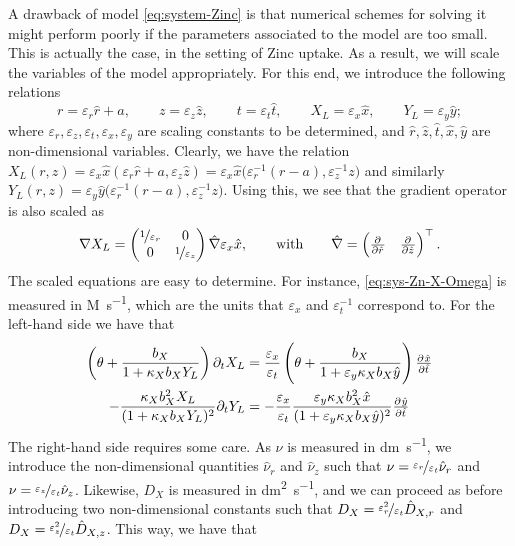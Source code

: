 \documentclass[11pt]{article}
\begin{document}
A drawback of model \eqref{eq:system-Zinc} is that numerical schemes for solving it might perform poorly if the parameters associated to the model are too small. This is actually the case, in the setting of Zinc uptake. As a result, we will scale the variables of the model appropriately. For this end, we introduce the following relations
\[
    r = \varepsilon_r \hat{r} + a,
    \qquad
    z = \varepsilon_z \hat{z},
    \qquad
    t = \varepsilon_t \hat{t},
    \qquad
    X_L = \varepsilon_x \hat{x},
    \qquad
    Y_L = \varepsilon_y \hat{y};
\]
where \( \varepsilon_r, \varepsilon_z, \varepsilon_t, \varepsilon_x, \varepsilon_y\) are scaling constants to be determined, and \(\hat{r}, \hat z, \hat t, \hat x, \hat y\) are non-dimensional variables.
Clearly, we have the relation \(X_L(r,z) = \varepsilon_x \hat{x} (\varepsilon_r \hat r + a, \varepsilon_z \hat z) = \varepsilon_x \hat{x} \big( \varepsilon_r^{-1} (r-a) , \varepsilon_z^{-1} z\big) \) and similarly \(Y_L (r,z) = \varepsilon_y \hat{y} \big( \varepsilon_r^{-1} (r-a), \varepsilon_z^{-1} z \big)\). Using this, we see that the gradient operator is also scaled as
\[
    \nabla X_L =
    \begin{pmatrix}
        \nicefrac{1}{\varepsilon_r} & 0 \\
        0 & \nicefrac{1}{\varepsilon_z}
    \end{pmatrix}
    \hat{\nabla} \varepsilon_x \hat{x},
    \qquad \text{with} \qquad
    \hat{\nabla} = 
    \begin{pmatrix}
        \pd{ }{\hat r}
        &
        \pd{ }{\hat z}
    \end{pmatrix}^\top .
\]
The scaled equations are easy to determine. For instance,  \eqref{eq:sys-Zn-X-Omega} is measured in \si{M.s^{-1}}, which are the units that \(\varepsilon_x\) and \(\varepsilon_t^{-1}\) correspond to. For the left-hand side we have that
\begin{align}
    \left( \theta + \frac{b_X}{1 + \kappa_X b_X Y_L} \right) \partial_t X_L &= \frac{\varepsilon_x}{\varepsilon_t} \left( \theta + \frac{b_X}{1 + \varepsilon_y \kappa_X b_X \hat{y}} \right)  \pd{\hat{x}}{\hat{t}}
    \\
    - \frac{\kappa_X b_X^2 X_L}{(1+\kappa_X b_X Y_L)^2} \partial_t Y_L &=
    -\frac{\varepsilon_x}{\varepsilon_t} \frac{\varepsilon_y \kappa_X b_X^2 \hat{x}}{(1+ \varepsilon_y\kappa_X b_X \hat{y})^2} \pd{\hat y}{\hat t}
\end{align}
The right-hand side requires some care. As \(\nu\) is measured in \si{dm.s^{-1}}, we introduce the non-dimensional quantities \( \hat{\nu}_r\) and \( \hat{\nu}_z\) such that \( \nu = \nicefrac{\varepsilon_r}{\varepsilon_t} \hat{\nu}_r \) and \( \nu = \nicefrac{\varepsilon_z}{\varepsilon_t} \hat{\nu}_z \). Likewise, \(D_X\) is measured in \si{dm^2.s^{-1}}, and we can proceed as before introducing two non-dimensional constants such that \(D_{X} = \nicefrac{\varepsilon_r^2}{\varepsilon_t} \hat{D}_{X,r}\) and \(D_{X} = \nicefrac{\varepsilon_z^2}{\varepsilon_t} \hat{D}_{X,z}\). This way, we have that
\end{document}
